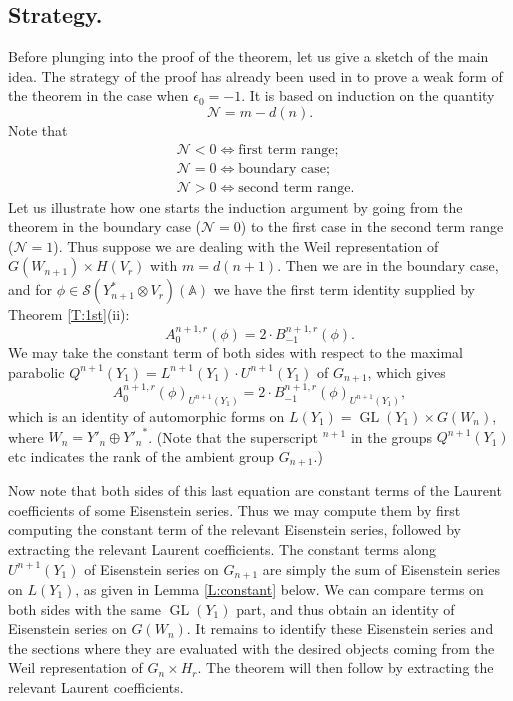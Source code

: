 \documentclass[10pt]{amsart}
\theoremstyle{plain}
\numberwithin{equation}{section}
\begin{document}
 \subsection{\bf Strategy.} 
 Before plunging into the proof of the theorem, let us give a sketch of the main idea.
 The strategy of the proof has already been used in \cite{GT} to prove
 a weak form of the theorem in the case when $\epsilon_0 = -1$.  It is
 based on induction on the quantity 
 \[   \mathcal{N} =  m - d(n). \]
 Note that
 \begin{align*}
   &\mathcal{N} < 0 \Longleftrightarrow \text{first term range};\\
   &\mathcal{N} = 0 \Longleftrightarrow \text{boundary case}; \\ 
  &\mathcal{N} > 0 \Longleftrightarrow \text{second term range}.
 \end{align*}
 Let us illustrate how one starts the induction argument by going from
 the theorem in the boundary case ($\mathcal{N} = 0$)  to the first
 case in the second term range ($\mathcal{N} = 1$).
Thus suppose we are dealing with the Weil representation of
$G(W_{n+1})\times H(V_r)$ with $m = d(n+1)$.  Then we are in the
boundary case, and for $\phi \in \mathcal{S}(Y_{n+1}^* \otimes
V_r)({\mathbb{A}})$ we have the first term identity supplied by Theorem \ref{T:1st}(ii):
\[  A^{n+1,r}_{0}(\phi) = 2  \cdot B_{-1}^{n+1, r}(\phi).  \]
 We may take the constant term of both sides with respect to the maximal parabolic 
 $Q^{n+1}(Y_1) = L^{n+1}(Y_1) \cdot U^{n+1}(Y_1)$ of $G_{n+1}$, which gives
 \[  A^{n+1,r}_0(\phi)_{U^{n+1}(Y_1)}  = 2 \cdot
 B^{n+1,r}_{-1}(\phi)_{U^{n+1}(Y_1)}, \]
 which is an identity of automorphic forms on $L(Y_1) = {\operatorname{GL}}(Y_1)
 \times G(W_{n})$, where $W_{n} = Y'_n \oplus {Y'_n}^*$. (Note that the
 superscript $^{n+1}$ in the groups $Q^{n+1}(Y_1)$ etc indicates the
 rank of the ambient group $G_{n+1}$.)
 \vskip 5pt
 
 Now note that both sides of this last equation are constant terms of
 the Laurent coefficients of some Eisenstein series. Thus we may
 compute them by first computing the constant term of the relevant
 Eisenstein series, followed by extracting the relevant Laurent
 coefficients.    The constant terms along  $U^{n+1}(Y_1)$ of
 Eisenstein series on $G_{n+1}$ are simply the sum of Eisenstein
 series on $L(Y_1)$, as given in Lemma \ref{L:constant} below.  We can
 compare terms on both sides with the same ${\operatorname{GL}}(Y_1)$ part, and thus
 obtain an identity of Eisenstein series on $G(W_n)$. It remains to
 identify these Eisenstein series  and the sections where they are
 evaluated with the desired objects coming from the Weil
 representation of $G_n\times H_r$. The theorem will then follow by
 extracting the relevant Laurent coefficients. 
 
\end{document}

